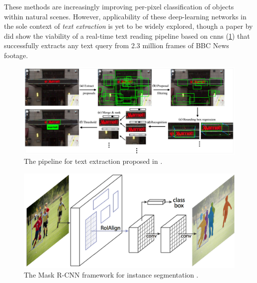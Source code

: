These methods are increasingly improving per-pixel classification of objects within natural scenes. However, applicability of these deep-learning networks in the sole context of \textit{text extraction} is yet to be widely explored, though a \citeyear{Jaderberg:2016wj} paper by \citet{Jaderberg:2016wj} did show the viability of a real-time text reading pipeline based on \glspl{cnn} (\cref{fig:background:detection:learning:jaderberg2016_cnn}) that successfully extracts any text query from 2.3 million frames of BBC News footage.

\begin{figure}[h]
  \centering 
  \includegraphics[width=\textwidth]{images/background/jaderberg2016_cnn}
  \caption[A pipeline for text extraction using CNNs]{The pipeline for text extraction proposed in \citep{Jaderberg:2016wj}.}
  \label{fig:background:detection:learning:jaderberg2016_cnn}
\end{figure}

\begin{figure}[p]
  \centering
  \includegraphics[width=\textwidth]{images/background/he2017_maskrcnnframework}
  \caption[The Mask R-CNN framework for instance segmentation]{The Mask R-CNN framework for instance segmentation \citep{He:2017ud}.}
  \label{fig:background:detection:learning:he2017_maskrcnnframework}
\end{figure}

